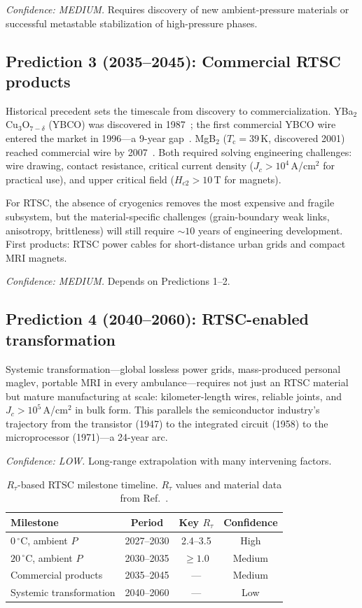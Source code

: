 \documentclass[prl,twocolumn,superscriptaddress,longbibliography,floatfix]{revtex4-2}
\newcommand{\tauasym}{\tau}
\newcommand{\Rtau}{R_{\tauasym}}
\newcommand{\Tc}{T_{\mathrm{c}}}
\begin{document}
\emph{Confidence: MEDIUM.}  Requires discovery of new
ambient-pressure materials or successful metastable
stabilization of high-pressure phases.

\subsection{Prediction 3 (2035--2045): Commercial RTSC products}

Historical precedent sets the timescale from discovery to
commercialization.  YBa$_2$Cu$_3$O$_{7-\delta}$ (YBCO) was
discovered in 1987~\cite{Wu1987}; the first commercial YBCO
wire entered the market in 1996---a 9-year gap~\cite{Larbalestier2001}.
MgB$_2$ ($\Tc = 39\,$K, discovered 2001) reached commercial
wire by 2007~\cite{Tomsic2007}.  Both required solving
engineering challenges: wire drawing, contact resistance,
critical current density ($J_c > 10^4\,$A/cm$^2$ for practical
use), and upper critical field ($H_{c2} > 10\,$T for
magnets).

For RTSC, the absence of cryogenics removes the most expensive
and fragile subsystem, but the material-specific challenges
(grain-boundary weak links, anisotropy, brittleness) will still
require $\sim 10$ years of engineering development.  First
products: RTSC power cables for short-distance urban grids and
compact MRI magnets.

\emph{Confidence: MEDIUM.}  Depends on Predictions 1--2.

\subsection{Prediction 4 (2040--2060): RTSC-enabled transformation}

Systemic transformation---global lossless power grids,
mass-produced personal maglev, portable MRI in every
ambulance---requires not just an RTSC material but mature
manufacturing at scale: kilometer-length wires, reliable
joints, and $J_c > 10^5\,$A/cm$^2$ in bulk form.  This
parallels the semiconductor industry's trajectory from the
transistor (1947) to the integrated circuit (1958) to the
microprocessor (1971)---a 24-year arc.

\emph{Confidence: LOW.}  Long-range extrapolation with many
intervening factors.

\begin{table}[t]
\caption{\label{tab:timeline}%
$\Rtau$-based RTSC milestone timeline.  $\Rtau$ values and
material data from Ref.~\cite{HuangRTSC2026}.}
\begin{ruledtabular}
\begin{tabular}{lccc}
Milestone & Period & Key $\Rtau$ & Confidence \\
\hline
$0\,^\circ$C, ambient $P$ & 2027--2030 & 2.4--3.5 & High \\
$20\,^\circ$C, ambient $P$ & 2030--2035 & $\geq 1.0$ & Medium \\
Commercial products & 2035--2045 & --- & Medium \\
Systemic transformation & 2040--2060 & --- & Low \\
\end{tabular}
\end{ruledtabular}
\end{table}
\end{document}
